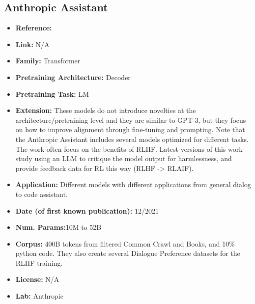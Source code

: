 \documentclass{article}
\begin{document}
\subsection{Anthropic Assistant}
            \begin{itemize}
                \item \textbf{Reference:}~
                \item \textbf{Link:} N/A
                \item \textbf{Family:} Transformer 
                \item \textbf{Pretraining Architecture:} Decoder
                \item \textbf{Pretraining Task:} LM
                \item \textbf{Extension:} These models do not introduce novelties at the architecture/pretraining level and they are similar to GPT-3, but they focus on how to improve alignment through fine-tuning and prompting. Note that the Anthropic Assistant includes several models optimized for different tasks. The work often focus on the benefits of RLHF. Latest versions of this work study using an LLM to critique the model output for harmlessness, and provide feedback data for RL this way (RLHF -> RLAIF).   
                \item \textbf{Application:} Different models with different applications from general dialog to code assistant.
                \item \textbf{Date (of first known publication):} 12/2021
                \item \textbf{Num. Params:}10M to 52B
                \item \textbf{Corpus:} 400B tokens from filtered Common Crawl and Books, and 10\% python code. They also create several Dialogue Preference datasets for the RLHF training.
                \item \textbf{License:} N/A
                \item \textbf{Lab:} Anthropic
            \end{itemize}
\end{document}

